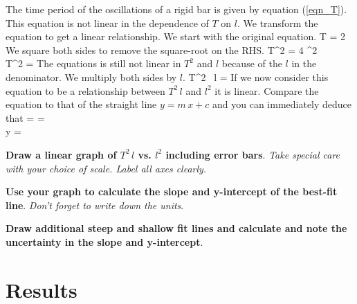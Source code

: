 \documentclass{article}
\begin{document}
      The time period of the oscillations of a rigid bar is given by equation (\ref{eqn_T}). This equation is not linear in the dependence of $T$ on $l$. We transform the equation to get a linear relationship. We start with the original equation.
%
      \beqn
         T = 2 \pi {}
      \eeqn
      We square both sides to remove the square-root on the RHS.
      \beqsn
         T^2 = 4 \pi^2  \\[0.25\baselineskip]
         \imply T^2 =  
      \eeqsn
      The equations is still not linear in $T^2$ and $l$ because of the $l$ in the denominator. We multiply both sides by $l$.
      \beq
         T^2 \, l =  
      \eeq
      If we now consider this equation to be a relationship between $T^2 \, l$ and $l^2$ it is linear. Compare the equation to that of the straight line $y = m \, x + c$ and you can immediately deduce that
      \beqc \label{graph}
          =  = \\[0.5\baselineskip]
         y = 
      \eeqc

      \textbf{Draw a linear graph of $T^2 \, l$ vs. $l^2$ including error bars}. \textit{Take special care with your choice of scale. Label all axes clearly.}

      \textbf{Use your graph to calculate the slope and y-intercept of the best-fit line}. \textit{Don't forget to write down the units}.

      \textbf{Draw additional steep and shallow fit lines and calculate and note the uncertainty in the slope and y-intercept}.


   \section*{Results}
\end{document}
